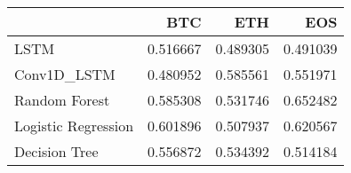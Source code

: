 \begin{tabular}{lrrr}
\toprule
{} &       BTC &       ETH &       EOS \\
\midrule
LSTM                &  0.516667 &  0.489305 &  0.491039 \\
Conv1D\_LSTM         &  0.480952 &  0.585561 &  0.551971 \\
Random Forest       &  0.585308 &  0.531746 &  0.652482 \\
Logistic Regression &  0.601896 &  0.507937 &  0.620567 \\
Decision Tree       &  0.556872 &  0.534392 &  0.514184 \\
\bottomrule
\end{tabular}
